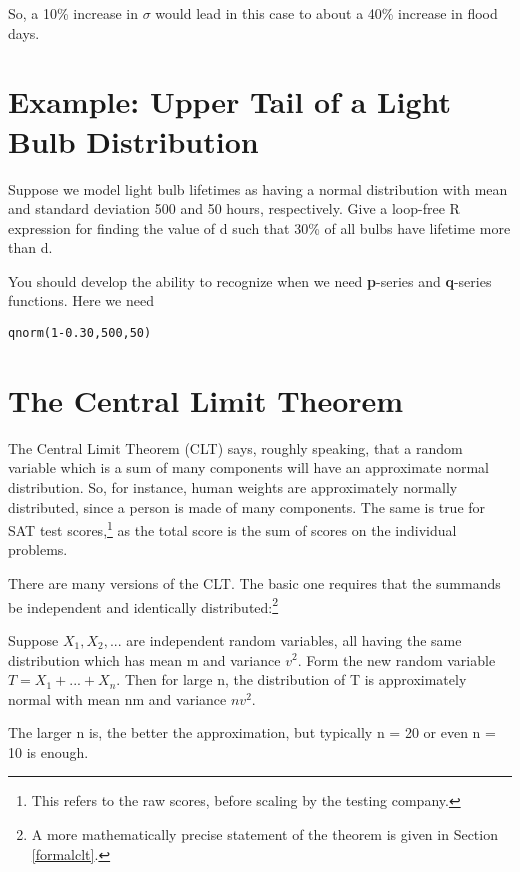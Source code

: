 So, a 10\% increase in $\sigma$ would lead in this case to about a 40\%
increase in flood days.

\section{Example:  Upper Tail of a Light Bulb Distribution}

Suppose we model light bulb lifetimes as having a normal
distribution with mean and standard deviation 500 and 50 hours,
respectively.  Give a loop-free R expression for finding the value of d
such that 30\% of all bulbs have lifetime more than d.

You should develop the ability to recognize when we need {\bf p}-series
and {\bf q}-series functions.  Here we need

\begin{lstlisting}
qnorm(1-0.30,500,50)
\end{lstlisting}

\section{The Central Limit Theorem}
\label{theclt}

The Central Limit Theorem (CLT) says, roughly speaking, that a random
variable which is a sum of many components will have an approximate
normal distribution.  So, for instance, human weights are approximately
normally distributed, since a person is made of many components.  The
same is true for SAT test scores,\footnote{This refers to the raw
scores, before scaling by the testing company.} as the total score is
the sum of scores on the individual problems.

There are many versions of the CLT.  The basic one requires that the
summands be independent and identically distributed:\footnote{A more
mathematically precise statement of the theorem is given in Section
\ref{formalclt}.}

\begin{theorem}
\label{impreciseclt}

Suppose $X_1, X_2, ...$ are independent random variables, all having the
same distribution which has mean m and variance $v^2$.  Form the new
random variable $T = X_1+...+X_n$.  Then for large n, the distribution
of T is approximately normal with mean nm and variance $nv^2$.

\end{theorem}

The larger n is, the better the approximation, but typically n = 20 or
even n = 10 is enough.

